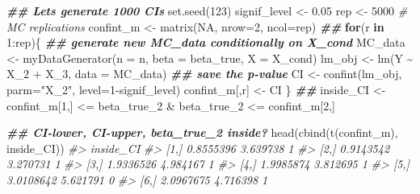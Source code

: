\documentclass[
  14pt,
]{memoir}
\newenvironment{Shaded}{\begin{snugshade}}{\end{snugshade}}
\newcommand{\AttributeTok}[1]{\textcolor[rgb]{0.77,0.63,0.00}{#1}}
\newcommand{\CommentTok}[1]{\textcolor[rgb]{0.56,0.35,0.01}{\textit{#1}}}
\newcommand{\ConstantTok}[1]{\textcolor[rgb]{0.00,0.00,0.00}{#1}}
\newcommand{\ControlFlowTok}[1]{\textcolor[rgb]{0.13,0.29,0.53}{\textbf{#1}}}
\newcommand{\DecValTok}[1]{\textcolor[rgb]{0.00,0.00,0.81}{#1}}
\newcommand{\DocumentationTok}[1]{\textcolor[rgb]{0.56,0.35,0.01}{\textbf{\textit{#1}}}}
\newcommand{\FloatTok}[1]{\textcolor[rgb]{0.00,0.00,0.81}{#1}}
\newcommand{\FunctionTok}[1]{\textcolor[rgb]{0.00,0.00,0.00}{#1}}
\newcommand{\NormalTok}[1]{#1}
\newcommand{\OtherTok}[1]{\textcolor[rgb]{0.56,0.35,0.01}{#1}}
\newcommand{\SpecialCharTok}[1]{\textcolor[rgb]{0.00,0.00,0.00}{#1}}
\newcommand{\StringTok}[1]{\textcolor[rgb]{0.31,0.60,0.02}{#1}}
\begin{document}
\begin{Shaded}
\begin{Highlighting}[]
\DocumentationTok{\#\# Let\textquotesingle{}s generate 1000 CIs }
\FunctionTok{set.seed}\NormalTok{(}\DecValTok{123}\NormalTok{)}
\NormalTok{signif\_level }\OtherTok{\textless{}{-}}  \FloatTok{0.05}
\NormalTok{rep          }\OtherTok{\textless{}{-}} \DecValTok{5000} \CommentTok{\# MC replications}
\NormalTok{confint\_m    }\OtherTok{\textless{}{-}} \FunctionTok{matrix}\NormalTok{(}\ConstantTok{NA}\NormalTok{, }\AttributeTok{nrow=}\DecValTok{2}\NormalTok{, }\AttributeTok{ncol=}\NormalTok{rep)}
\DocumentationTok{\#\#}
\ControlFlowTok{for}\NormalTok{(r }\ControlFlowTok{in} \DecValTok{1}\SpecialCharTok{:}\NormalTok{rep)\{}
  \DocumentationTok{\#\# generate new MC\_data conditionally on X\_cond}
\NormalTok{    MC\_data }\OtherTok{\textless{}{-}} \FunctionTok{myDataGenerator}\NormalTok{(}\AttributeTok{n    =}\NormalTok{ n, }
                               \AttributeTok{beta =}\NormalTok{ beta\_true, }
                               \AttributeTok{X    =}\NormalTok{ X\_cond)}
\NormalTok{    lm\_obj            }\OtherTok{\textless{}{-}} \FunctionTok{lm}\NormalTok{(Y }\SpecialCharTok{\textasciitilde{}}\NormalTok{ X\_2 }\SpecialCharTok{+}\NormalTok{ X\_3, }\AttributeTok{data =}\NormalTok{ MC\_data)}
    \DocumentationTok{\#\# save the p{-}value}
\NormalTok{    CI }\OtherTok{\textless{}{-}} \FunctionTok{confint}\NormalTok{(lm\_obj, }\AttributeTok{parm=}\StringTok{"X\_2"}\NormalTok{, }\AttributeTok{level=}\DecValTok{1}\SpecialCharTok{{-}}\NormalTok{signif\_level)}
\NormalTok{    confint\_m[,r] }\OtherTok{\textless{}{-}}\NormalTok{ CI}
\NormalTok{\}}
\DocumentationTok{\#\#}
\NormalTok{inside\_CI  }\OtherTok{\textless{}{-}}\NormalTok{ confint\_m[}\DecValTok{1}\NormalTok{,] }\SpecialCharTok{\textless{}=}\NormalTok{ beta\_true\_2 }\SpecialCharTok{\&} 
\NormalTok{                beta\_true\_2 }\SpecialCharTok{\textless{}=}\NormalTok{ confint\_m[}\DecValTok{2}\NormalTok{,]}

\DocumentationTok{\#\# CI{-}lower, CI{-}upper, beta\_true\_2 inside?}
\FunctionTok{head}\NormalTok{(}\FunctionTok{cbind}\NormalTok{(}\FunctionTok{t}\NormalTok{(confint\_m), inside\_CI))}
\CommentTok{\#\textgreater{}                         inside\_CI}
\CommentTok{\#\textgreater{} [1,] 0.8555396 3.639738         1}
\CommentTok{\#\textgreater{} [2,] 0.9143542 3.270731         1}
\CommentTok{\#\textgreater{} [3,] 1.9336526 4.984167         1}
\CommentTok{\#\textgreater{} [4,] 1.9985874 3.812695         1}
\CommentTok{\#\textgreater{} [5,] 3.0108642 5.621791         0}
\CommentTok{\#\textgreater{} [6,] 2.0967675 4.716398         1}


\end{Highlighting}
\end{Shaded}
\end{document}
